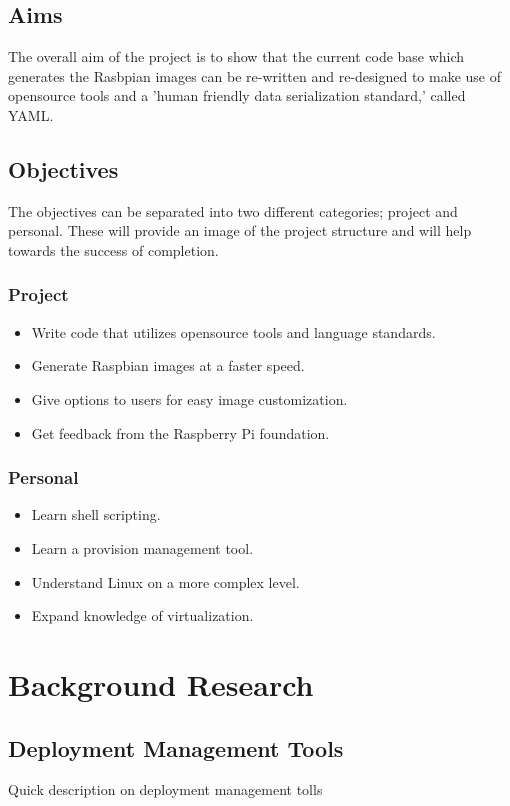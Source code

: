 \documentclass[12pt,a4paper]{report}
\begin{document}
\section{Aims}
The overall aim of the project is to show that the current code base which generates the Rasbpian images can be re-written and re-designed to make use of opensource tools and a 'human friendly data serialization standard,'\citep{yaml} called YAML. 
\section{Objectives}
The objectives can be separated into two different categories; project and personal. These will provide an image of the project structure and will help towards the success of completion. 
\subsection{Project}
\begin{itemize}
\item{Write code that utilizes opensource tools and language standards.}
\item{Generate Raspbian images at a faster speed.}
\item{Give options to users for easy image customization.}
\item{Get feedback from the Raspberry Pi foundation.}
\end{itemize}  
\subsection{Personal}
\begin{itemize}
\item{Learn shell scripting.}
\item{Learn a provision management tool.}
\item{Understand Linux on a more complex level.}
\item{Expand knowledge of virtualization.}
\end{itemize}  

\chapter{Background Research}

\section{Deployment Management Tools}
Quick description on deployment management tolls
\end{document}
